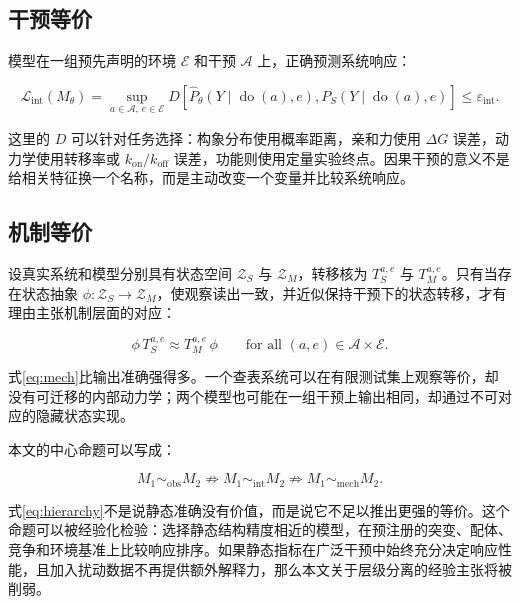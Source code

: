 \documentclass[10pt]{article}
\begin{document}
\subsection*{干预等价}

模型在一组预先声明的环境 $\mathcal E$ 和干预 $\mathcal A$ 上，正确预测系统响应：

\begin{equation}
\mathcal L_{\mathrm{int}}(M_\theta)
=
\sup_{a\in\mathcal A,\,e\in\mathcal E}
D\!\left[
\widehat P_\theta(Y\mid \operatorname{do}(a),e),
P_S(Y\mid \operatorname{do}(a),e)
\right]
\leq \varepsilon_{\mathrm{int}}.
\label{eq:int}
\end{equation}

这里的 $D$ 可以针对任务选择：构象分布使用概率距离，亲和力使用 $\Delta G$ 误差，动力学使用转移率或 $k_{\mathrm{on}}/k_{\mathrm{off}}$ 误差，功能则使用定量实验终点。因果干预的意义不是给相关特征换一个名称，而是主动改变一个变量并比较系统响应\cite{pearl2009,peters2017}。

\subsection*{机制等价}

设真实系统和模型分别具有状态空间 $\mathcal Z_S$ 与 $\mathcal Z_M$，转移核为 $T_S^{a,e}$ 与 $T_M^{a,e}$。只有当存在状态抽象 $\phi:\mathcal Z_S\to\mathcal Z_M$，使观察读出一致，并近似保持干预下的状态转移，才有理由主张机制层面的对应：

\begin{equation}
\phi\,T_S^{a,e}
\approx
T_M^{a,e}\,\phi
\qquad
\text{for all }(a,e)\in\mathcal A\times\mathcal E.
\label{eq:mech}
\end{equation}

式\eqref{eq:mech}比输出准确强得多。一个查表系统可以在有限测试集上观察等价，却没有可迁移的内部动力学；两个模型也可能在一组干预上输出相同，却通过不可对应的隐藏状态实现。

本文的中心命题可以写成：

\begin{equation}
M_1\sim_{\mathrm{obs}}M_2
\not\Rightarrow
M_1\sim_{\mathrm{int}}M_2
\not\Rightarrow
M_1\sim_{\mathrm{mech}}M_2.
\label{eq:hierarchy}
\end{equation}

式\eqref{eq:hierarchy}不是说静态准确没有价值，而是说它不足以推出更强的等价。这个命题可以被经验化检验：选择静态结构精度相近的模型，在预注册的突变、配体、竞争和环境基准上比较响应排序。如果静态指标在广泛干预中始终充分决定响应性能，且加入扰动数据不再提供额外解释力，那么本文关于层级分离的经验主张将被削弱。
\end{document}
